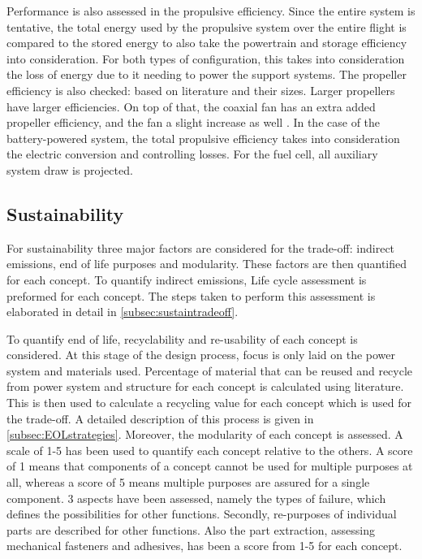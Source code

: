 Performance is also assessed in the propulsive efficiency. Since the entire system is tentative, the total energy used by the propulsive system over the entire flight is compared to the stored energy to also take the powertrain and storage efficiency into consideration. For both types of configuration, this takes into consideration the loss of energy due to it needing to power the support systems.
The propeller efficiency is also checked: based on literature and their sizes. Larger propellers have larger efficiencies. On top of that, the coaxial fan has an extra added propeller efficiency, and the fan a slight increase as well \cite{rotaryWingAero}.
In the case of the battery-powered system, the total propulsive efficiency takes into consideration the electric conversion and controlling losses. For the fuel cell, all auxiliary system draw is projected.


\subsection{Sustainability}
For sustainability three major factors are considered for the trade-off: indirect emissions, end of life purposes and modularity. These factors are then quantified for each concept. To quantify indirect emissions, Life cycle assessment is preformed for each concept. The steps taken to perform this assessment is elaborated in detail in \autoref{subsec:sustaintradeoff}. 

To quantify end of life, recyclability and re-usability of each concept is considered. At this stage of the design process, focus is only laid on the power system and materials used. Percentage of material that can be reused and recycle from power system and structure for each concept is calculated using literature. This is then used to calculate a recycling value for each concept which is used for the trade-off. A detailed description of this process is given in \autoref{subsec:EOLstrategies}. Moreover, the modularity of each concept is assessed. A scale of 1-5 has been used to quantify each concept relative to the others. A score of 1 means that components of a concept cannot be used for multiple purposes at all, whereas a score of 5 means multiple purposes are assured for a single component. 3 aspects have been assessed, namely the types of failure, which defines the possibilities for other functions. Secondly, re-purposes of individual parts are described for other functions. Also the part extraction, assessing mechanical fasteners and adhesives, has been a score from 1-5 for each concept. 

